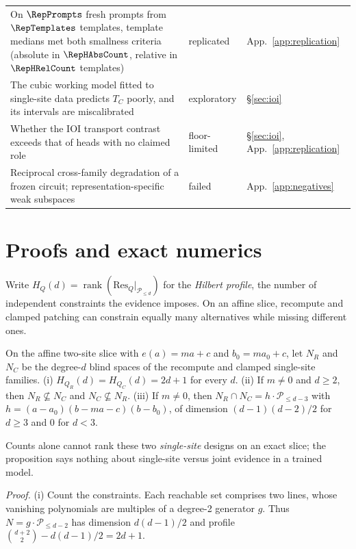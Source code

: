 \begin{table}[h]
\begin{tabularx}{\textwidth}{@{}>{\raggedright\arraybackslash}X >{\raggedright\arraybackslash}p{} l@{}}
On $\RepPrompts$ fresh prompts from $\RepTemplates$ templates, template medians met both smallness criteria (absolute in $\RepHAbsCount$, relative in $\RepHRelCount$ templates) & replicated & App.~\ref{app:replication} \\
The cubic working model fitted to single-site data predicts $T_C$ poorly, and its intervals are miscalibrated & exploratory & \S\ref{sec:ioi} \\
Whether the IOI transport contrast exceeds that of heads with no claimed role & floor-limited & \S\ref{sec:ioi}, App.~\ref{app:replication} \\
\midrule
Reciprocal cross-family degradation of a frozen circuit; representation-specific weak subspaces & failed & App.~\ref{app:negatives} \\
\bottomrule
\end{tabularx}
\end{table}

\FloatBarrier
\section{Proofs and exact numerics}
\label{app:proofs}

Write $H_Q(d)=\operatorname{rank}(\mathrm{Res}_Q|_{\mathcal P_{\le d}})$ for the \emph{Hilbert profile}, the number of independent
constraints the evidence imposes. On an affine slice, recompute and clamped patching can constrain equally many
alternatives while missing different ones.
\begin{proposition}
\label{prop:incomparable}
On the affine two-site slice with $e(a)=ma+c$ and $b_0=ma_0+c$, let $N_R$ and $N_C$ be the degree-$d$ blind spaces
of the recompute and clamped single-site families. (i) $H_{Q_R}(d)=H_{Q_C}(d)=2d+1$ for every $d$. (ii) If $m\neq0$
and $d\ge2$, then $N_R\not\subseteq N_C$ and $N_C\not\subseteq N_R$. (iii) If $m\neq0$, then $N_R\cap N_C=h\cdot
\mathcal P_{\le d-3}$ with $h=(a-a_0)(b-ma-c)(b-b_0)$, of dimension $(d-1)(d-2)/2$ for $d\ge3$ and $0$ for $d<3$.
\end{proposition}

Counts alone cannot rank these two \emph{single-site} designs on an exact slice; the proposition says nothing about
single-site versus joint evidence in a trained model. 

\emph{Proof.} (i) Count the constraints. Each reachable set comprises two lines, whose vanishing polynomials are
multiples of a degree-2 generator $g$. Thus $N=g\cdot\mathcal P_{\le d-2}$ has dimension $d(d-1)/2$ and profile
$\binom{d+2}{2}-d(d-1)/2=2d+1$.

